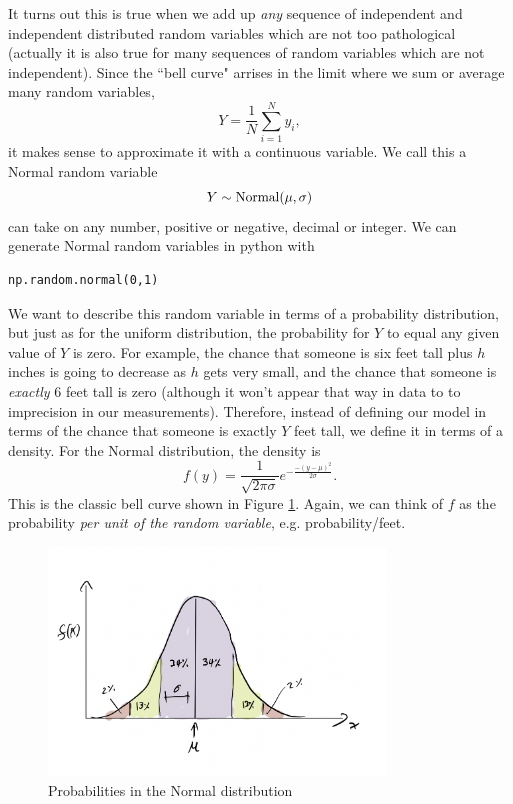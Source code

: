 It turns out this is true when we add up \emph{any} sequence of independent and independent distributed  random variables which are not too pathological (actually it is also true for many sequences of random variables which are not independent). Since the ``bell curve" arrises in the limit where we sum or average many random variables,
\begin{equation}
Y = \frac{1}{N}\sum_{i=1}^Ny_i,
\end{equation}
it makes sense to approximate it with a continuous variable. We call this a Normal random variable
\begin{equation}
Y \sim {\rm Normal}(\mu,\sigma)
\end{equation}
can take on any number, positive or negative, decimal or integer. 
We can generate Normal random variables in python with
\begin{Verbatim}
np.random.normal(0,1)
\end{Verbatim}


We want to describe this random variable in terms of a probability distribution, but just as for the uniform distribution, the probability for $Y$ to equal any given value of $Y$ is zero.  For example, the chance that someone is six feet tall plus $h$ inches is going to decrease as $h$ gets very small, and the chance that someone is \emph{exactly} $6$ feet tall is zero (although it won't appear that way in data to to imprecision in our measurements). Therefore, instead of defining our model in terms of the chance that someone is exactly $Y$ feet tall, we define it in terms of a density. 
For the Normal distribution, the density is 
\begin{equation}
f(y) = \frac{1}{\sqrt{2\pi \sigma}}e^{-\frac{-(y-\mu)^2}{2\sigma}}.
\end{equation}
This is the classic bell curve shown in Figure \ref{fig:bellcurve}. 
Again, we can think of $f$ as the probability \emph{per unit of the random variable}, e.g. probability/feet.  

\begin{figure}[h]
\centering
\includegraphics[width=0.8\textwidth]{bellcurve}
\caption{Probabilities in the Normal distribution}\label{fig:bellcurve}
\end{figure}

